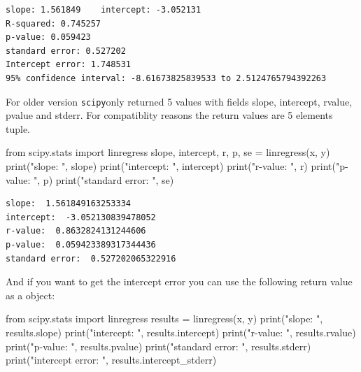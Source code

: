 \documentclass[
  letterpaper,
  DIV=11,
  numbers=noendperiod]{scrreprt}
\newenvironment{Shaded}{\begin{snugshade}}{\end{snugshade}}
\newcommand{\BuiltInTok}[1]{\textcolor[rgb]{0.00,0.23,0.31}{#1}}
\newcommand{\ImportTok}[1]{\textcolor[rgb]{0.00,0.46,0.62}{#1}}
\newcommand{\NormalTok}[1]{\textcolor[rgb]{0.00,0.23,0.31}{#1}}
\newcommand{\OperatorTok}[1]{\textcolor[rgb]{0.37,0.37,0.37}{#1}}
\newcommand{\StringTok}[1]{\textcolor[rgb]{0.13,0.47,0.30}{#1}}
\begin{document}
\begin{verbatim}
slope: 1.561849    intercept: -3.052131
R-squared: 0.745257
p-value: 0.059423
standard error: 0.527202
Intercept error: 1.748531
95% confidence interval: -8.61673825839533 to 2.5124765794392263
\end{verbatim}

\begin{tcolorbox}[enhanced jigsaw, leftrule=.75mm, bottomrule=.15mm, colbacktitle=quarto-callout-important-color!10!white, title=\textcolor{quarto-callout-important-color}{\faExclamation}\hspace{0.5em}{Important}, breakable, arc=.35mm, toptitle=1mm, opacityback=0, titlerule=0mm, coltitle=black, colback=white, opacitybacktitle=0.6, colframe=quarto-callout-important-color-frame, left=2mm, rightrule=.15mm, toprule=.15mm, bottomtitle=1mm]

For older version \texttt{scipy}only returned 5 values with fields
slope, intercept, rvalue, pvalue and stderr. For compatiblity reasons
the return values are 5 elements tuple.

\begin{Shaded}
\begin{Highlighting}[]
\ImportTok{from}\NormalTok{ scipy.stats }\ImportTok{import}\NormalTok{ linregress}
\NormalTok{slope, intercept, r, p, se }\OperatorTok{=}\NormalTok{ linregress(x, y)}
\BuiltInTok{print}\NormalTok{(}\StringTok{"slope: "}\NormalTok{, slope)}
\BuiltInTok{print}\NormalTok{(}\StringTok{"intercept: "}\NormalTok{, intercept)}
\BuiltInTok{print}\NormalTok{(}\StringTok{"r{-}value: "}\NormalTok{, r)}
\BuiltInTok{print}\NormalTok{(}\StringTok{"p{-}value: "}\NormalTok{, p)}
\BuiltInTok{print}\NormalTok{(}\StringTok{"standard error: "}\NormalTok{, se)}
\end{Highlighting}
\end{Shaded}

\begin{verbatim}
slope:  1.561849163253334
intercept:  -3.052130839478052
r-value:  0.8632824131244606
p-value:  0.059423389317344436
standard error:  0.527202065322916
\end{verbatim}

And if you want to get the intercept error you can use the following
return value as a object:

\begin{Shaded}
\begin{Highlighting}[]
\ImportTok{from}\NormalTok{ scipy.stats }\ImportTok{import}\NormalTok{ linregress}
\NormalTok{results }\OperatorTok{=}\NormalTok{ linregress(x, y)}
\BuiltInTok{print}\NormalTok{(}\StringTok{"slope: "}\NormalTok{, results.slope)}
\BuiltInTok{print}\NormalTok{(}\StringTok{"intercept: "}\NormalTok{, results.intercept)}
\BuiltInTok{print}\NormalTok{(}\StringTok{"r{-}value: "}\NormalTok{, results.rvalue)}
\BuiltInTok{print}\NormalTok{(}\StringTok{"p{-}value: "}\NormalTok{, results.pvalue)}
\BuiltInTok{print}\NormalTok{(}\StringTok{"standard error: "}\NormalTok{, results.stderr)}
\BuiltInTok{print}\NormalTok{(}\StringTok{"intercept error: "}\NormalTok{, results.intercept\_stderr)}
\end{Highlighting}
\end{Shaded}


\end{tcolorbox}
\end{document}
